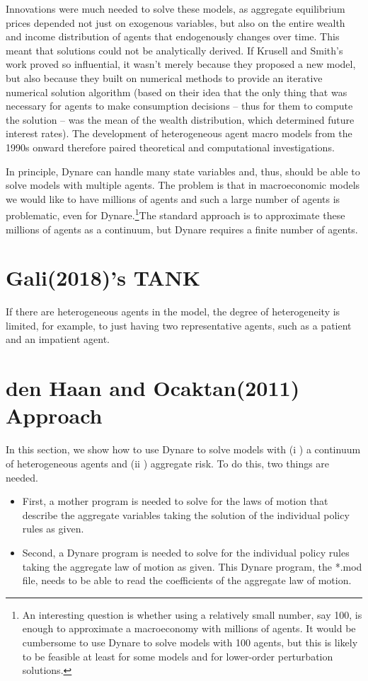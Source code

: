\documentclass[cn,10pt,math=newtx,citestyle=gb7714-2015,bibstyle=gb7714-2015]{elegantbook}
\begin{document}
	Innovations were much needed to solve these models, as aggregate equilibrium prices depended not just on exogenous variables, but also on the entire wealth and income distribution of agents that endogenously changes over time. This meant that solutions could not be analytically derived. If Krusell and Smith’s work proved so influential, it wasn’t merely because they proposed a new model, but also because they built on numerical methods to provide an iterative numerical solution algorithm (based on their idea that the only thing that was necessary for agents to make consumption decisions – thus for them to compute the solution – was the mean of the wealth distribution, which determined future interest rates). The development of heterogeneous agent macro models from the 1990s onward therefore paired theoretical and computational investigations.
	
	In principle, Dynare can handle many state variables and, thus, should be able to solve models with multiple agents. The problem is that in macroeconomic models we would like to have millions of agents and such a large number of agents is problematic, even for Dynare.\footnote{An interesting question is whether using a relatively small number, say 100, is enough to approximate a macroeconomy with millions of agents. It would be cumbersome to use Dynare to solve models with 100 agents, but this is likely to be feasible at least for some models and for lower-order perturbation solutions.}The standard approach is to approximate these millions of agents as a continuum, but Dynare requires a finite number of agents.
	
	\section{Gali(2018)'s TANK}
	
	If there are heterogeneous agents in the model, the degree of heterogeneity is limited, for example, to just having two representative agents, such as a patient and an impatient agent.
	
	
	\section{den Haan and Ocaktan(2011) Approach}
	
	In this section, we show how to use Dynare to solve models with (i ) a continuum of heterogeneous agents and (ii ) aggregate risk. To do this, two things are needed.
	\begin{itemize}
		\item First, a mother program is needed to solve for the laws of motion that describe the aggregate variables taking the solution of the individual policy rules as given.
		\item Second, a Dynare program is needed to solve for the individual policy rules taking the aggregate law of motion as given. This Dynare program, the *.mod file, needs to be able to read the coefficients of the aggregate law of motion.
	\end{itemize}
	
\end{document}
